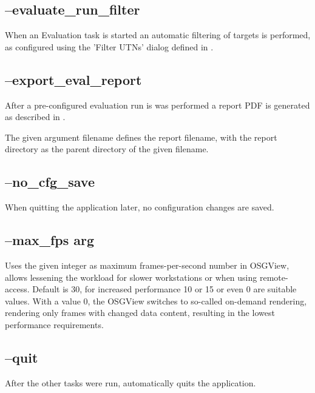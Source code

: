 \subsection{--evaluate\_run\_filter}

When an Evaluation task is started an automatic filtering of targets is performed, as configured using the 'Filter UTNs' dialog defined in .


\subsection{--export\_eval\_report}

After a pre-configured evaluation run is was performed a report PDF is generated as described in .

The given argument filename defines the report filename, with the report directory as the parent directory of the given filename.

\subsection{--no\_cfg\_save}

When quitting the application later, no configuration changes are saved.

\subsection{--max\_fps arg}

Uses the given integer as maximum frames-per-second number in OSGView, allows lessening the workload for slower workstations or when using remote-access. Default is 30, for increased performance 10 or 15 or even 0 are suitable values. With a value 0, the OSGView switches to so-called on-demand rendering, rendering only frames with changed data content, resulting in the lowest performance requirements.

\subsection{--quit}

After the other tasks were run, automatically quits the application.


